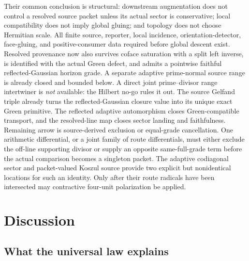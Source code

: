 \documentclass[11pt]{article}
\theoremstyle{definition}
\theoremstyle{remark}
\begin{document}
Their common conclusion is structural: downstream augmentation does not
control a resolved source packet unless its actual sector is conservative;
local compatibility does not imply global gluing; and topology does not
choose Hermitian scale.  All finite source, reporter, local incidence,
orientation-detector, face-gluing, and positive-consumer data required
before global descent exist.  Resolved provenance now also survives coface
saturation with a split left inverse, is identified with the actual Green
defect, and admits a pointwise faithful reflected-Gaussian horizon grade.  A
separate adaptive prime-normal source range is already closed and bounded
below.  A direct joint prime--divisor range intertwiner is \emph{not}
available: the Hilbert no-go rules it out.  The source Gelfand triple already
turns the reflected-Gaussian closure value into its unique exact Green
primitive.  The reflected adaptive automorphism closes Green-compatible
transport, and the resolved-line map closes sector landing and faithfulness.
Remaining arrow is source-derived exclusion or equal-grade cancellation.
One arithmetic differential, or a joint family of route differentials, must
either exclude the off-line supporting divisor or supply an opposite
same-full-grade term before the actual comparison becomes a singleton
packet.  The adaptive codiagonal sector and packet-valued Koszul source
provide two explicit but nonidentical locations for such an identity.  Only
after their route radicals have been intersected may contractive four-unit
polarization be applied.

\section{Discussion}

\subsection{What the universal law explains}
\end{document}
